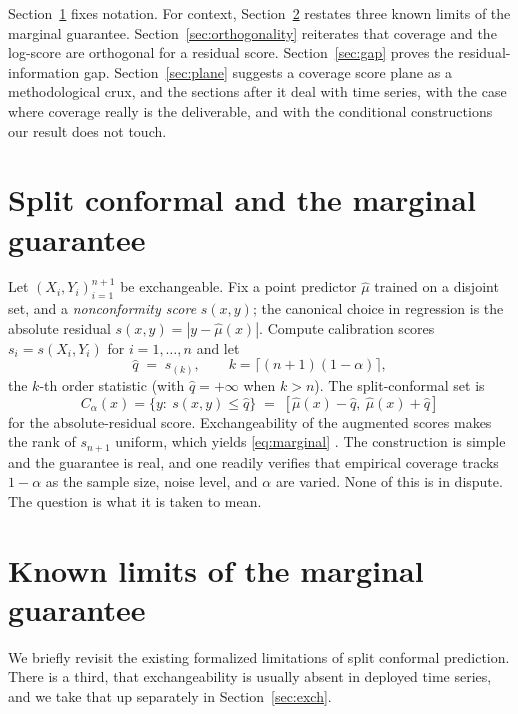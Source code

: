 \documentclass[11pt]{article}
\theoremstyle{definition}
\begin{document}
Section~\ref{sec:setup} fixes notation. For context, Section~\ref{sec:marginal} restates
three known limits of the marginal guarantee. Section~\ref{sec:orthogonality} reiterates
that coverage and the log-score are orthogonal for a residual score.
Section~\ref{sec:gap} proves the residual-information gap. Section~\ref{sec:plane}
suggests a coverage score plane as a methodological crux, and the sections after it deal
with time series, with the case where coverage really is the deliverable, and with the
conditional constructions our result does not touch.

\section{Split conformal and the marginal guarantee}\label{sec:setup}

Let $(X_i,Y_i)_{i=1}^{n+1}$ be exchangeable. Fix a point predictor $\hat\mu$ trained on
a disjoint set, and a \emph{nonconformity score} $s(x,y)$; the canonical choice in
regression is the absolute residual $s(x,y)=|y-\hat\mu(x)|$. Compute calibration
scores $s_i=s(X_i,Y_i)$ for $i=1,\dots,n$ and let
\begin{equation}\label{eq:q}
  \hat q \;=\; s_{(k)}, \qquad k=\big\lceil (n+1)(1-\alpha)\big\rceil,
\end{equation}
the $k$-th order statistic (with $\hat q=+\infty$ when $k>n$). The split-conformal set is
\begin{equation}\label{eq:set}
  C_\alpha(x)=\{y:\ s(x,y)\le \hat q\}
  \;=\;[\hat\mu(x)-\hat q,\ \hat\mu(x)+\hat q]
\end{equation}
for the absolute-residual score. Exchangeability of the augmented scores makes the rank
of $s_{n+1}$ uniform, which yields \eqref{eq:marginal}
\citep{vovk2005algorithmic,lei2018distribution}. The construction is simple and the
guarantee is real, and one readily verifies that empirical coverage tracks $1-\alpha$ as
the sample size, noise level, and $\alpha$ are varied. None of this is in dispute. The
question is what it is taken to mean.

\section{Known limits of the marginal guarantee}\label{sec:marginal}

We briefly revisit the existing formalized limitations of split conformal prediction. There
is a third, that exchangeability is usually absent in deployed time series, and we take that
up separately in Section~\ref{sec:exch}.
\end{document}
